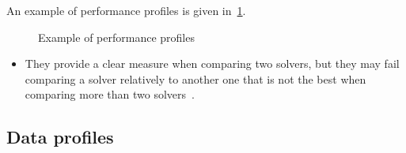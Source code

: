 An example of performance profiles is given in~\cref{fig:performance-profile-example}.

\begin{figure}[ht]
    \centering
    \caption{Example of performance profiles}
    \label{fig:performance-profile-example}
\end{figure}

\begin{itemize}
    \item They provide a clear measure when comparing two solvers, but they may fail comparing a solver relatively to another one that is not the best when comparing more than two solvers~\cite{Gould_Scott_2016}.
\end{itemize}

\subsection{Data profiles}
